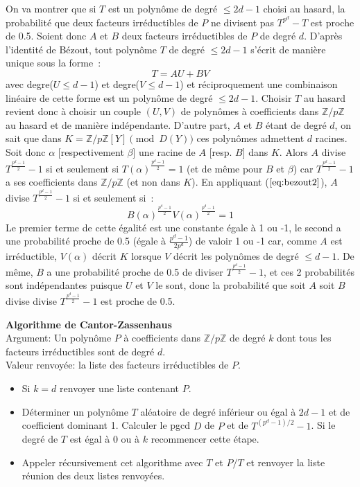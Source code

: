 \documentclass[a4paper,11pt]{article}
\begin{document}
\begin{giacjshere}
On va montrer que si $T$ est un polynôme de degré $\leq 2d-1$ choisi au hasard,
la probabilité que deux facteurs irréductibles de $P$ ne divisent pas 
$T^{p^d}-T$ est proche de 0.5. Soient donc $A$ et $B$ deux facteurs
irréductibles de $P$ de degré $d$. D'après l'identité de Bézout, tout 
polynôme $T$ de degré $\leq 2d-1$ s'écrit de manière unique sous la forme~:
\begin{equation} \label{eq:bezout2} 
T = A U + B V 
\end{equation}
avec degre($U \leq d-1$) et degre($V \leq d-1$) et réciproquement 
une combinaison linéaire de cette forme est un polynôme de degré $\leq 2d-1$.
Choisir $T$ au hasard revient donc à choisir un couple $(U,V)$ de polynômes
à coefficients dans $\mathbb{Z}/p\mathbb{Z}$ au hasard et
de manière indépendante. D'autre part, $A$ et $B$ étant de degré $d$, on
sait que dans $K=\mathbb{Z}/p\mathbb{Z}[Y] \pmod{D(Y)}$ ces polynômes admettent $d$ racines.
Soit donc $\alpha$ [respectivement $\beta$] une racine de $A$ [resp. $B$]
dans $K$. Alors $A$ divise $T^{\frac{p^d-1}{2}}-1$
si et seulement si $T(\alpha )^{\frac{p^d-1}{2}}=1$ (et de même pour
$B$ et $\beta$) car $T^{\frac{p^d-1}{2}}-1$ a ses coefficients dans
$\mathbb{Z}/p\mathbb{Z}$ (et non dans $K$). 
En appliquant (\(\ref{eq:bezout2}\)), $A$ divise $T^{\frac{p^d-1}{2}}-1$
si et seulement si~:
\[ B(\alpha )^{\frac{p^d-1}{2}}V(\alpha )^{\frac{p^d-1}{2}}=1 \]
Le premier terme de cette égalité est une constante égale à 1 ou -1, 
le second a une probabilité proche de 0.5 (égale à $\frac{p^d-1}{2p^d}$)
de valoir 1 ou -1 car, comme $A$ est irréductible,
$V(\alpha)$ décrit $K$ lorsque $V$ décrit les 
polynômes de degré $\leq d-1$.
De même, $B$ a une probabilité proche de 0.5 de diviser 
$T^{\frac{p^d-1}{2}}-1$, et ces 2 probabilités sont indépendantes
puisque $U$ et $V$ le sont, donc la probabilité que soit $A$ soit $B$ divise
divise $T^{\frac{p^d-1}{2}}-1$ est proche de 0.5.

{\bf Algorithme de Cantor-Zassenhaus}\\
Argument: Un polynôme $P$ à coefficients dans $\mathbb{Z}/p\mathbb{Z}$ de degré $k$
dont tous les facteurs irréductibles sont de degré $d$.\\
Valeur renvoyée: la liste des facteurs irréductibles de $P$.\\
\begin{itemize}
\item Si $k=d$ renvoyer une liste contenant $P$.
\item Déterminer un polynôme $T$ aléatoire de degré inférieur ou égal
à $2d-1$ et de coefficient dominant 1. Calculer le pgcd $D$ de $P$
et de $T^{(p^d-1)/2}-1$. Si le degré de $T$ est égal à 0 ou à $k$ 
recommencer cette étape.
\item Appeler récursivement cet algorithme avec $T$ et $P/T$ et
renvoyer la liste réunion des deux listes renvoyées.
\end{itemize}


\end{giacjshere}
\end{document}
